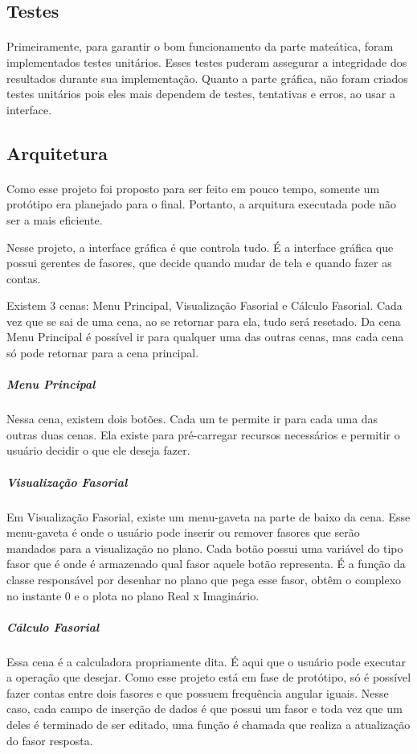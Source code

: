 \documentclass[conference,harvard, brazil]{sbatex}
\begin{document}
	\subsection{Testes}
	\paragraph{}Primeiramente, para garantir o bom funcionamento da parte mateática, foram implementados testes unitários. Esses testes puderam assegurar a integridade dos resultados durante sua implementação. Quanto a parte gráfica, não foram criados testes unitários pois eles mais dependem de testes, tentativas e erros, ao usar a interface.
	
	\subsection{Arquitetura}
	\paragraph{}Como esse projeto foi proposto para ser feito em pouco tempo, somente um protótipo era planejado para o final. Portanto, a arquitura executada pode não ser a mais eficiente.
	
	Nesse projeto, a interface gráfica é que controla tudo. É a interface gráfica que possui gerentes de fasores, que decide quando mudar de tela e quando fazer as contas.
	
	Existem 3 cenas: Menu Principal, Visualização Fasorial e Cálculo Fasorial. Cada vez que se sai de uma cena, ao se retornar para ela, tudo será resetado. Da cena Menu Principal é possível ir para qualquer uma das outras cenas, mas cada cena só pode retornar para a cena principal.
	\subparagraph{Menu Principal}Nessa cena, existem dois botões. Cada um te permite ir para cada uma das outras duas cenas. Ela existe para pré-carregar recursos necessários e permitir o usuário decidir o que ele deseja fazer.
	\subparagraph{Visualização Fasorial}Em Visualização Fasorial, existe um menu-gaveta na parte de baixo da cena. Esse menu-gaveta é onde o usuário pode inserir ou remover fasores que serão mandados para a visualização no plano. Cada botão possui uma variável do tipo fasor que é onde é armazenado qual fasor aquele botão representa. É a função da classe responsável por desenhar no plano que pega esse fasor, obtêm o complexo no instante 0 e o plota no plano Real x Imaginário.
	\subparagraph{Cálculo Fasorial}Essa cena é a calculadora propriamente dita. É aqui que o usuário pode executar a operação que desejar. Como esse projeto está em fase de protótipo, só é possível fazer contas entre dois fasores e que possuem frequência angular iguais. Nesse caso, cada campo de inserção de dados é que possui um fasor e toda vez que um deles é terminado de ser editado, uma função é chamada que realiza a atualização do fasor resposta.

%	
\end{document}
